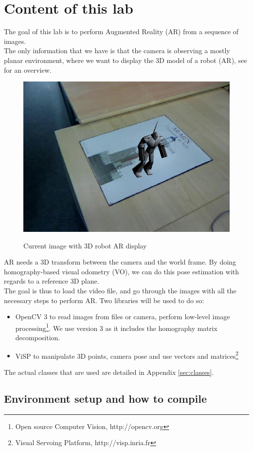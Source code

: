 \documentclass{ecnreport}
\begin{document}



\section{Content of this lab}

The goal of this lab is to perform Augmented Reality (AR) from a sequence of images.\\
The only information that we have is that the camera is observing a mostly planar environment, 
where we want to display the 3D model of a robot (AR), see  for an overview.

\begin{figure}[h!]
\centering\label{fig:ar}
 \includegraphics[width=.5\linewidth]{ar}
 \caption{Current image with 3D robot AR display}
\end{figure}

AR needs a 3D transform between the camera and the world frame. By doing homography-based visual odometry (VO), we can do this pose estimation 
with regards to a reference 3D plane. \\
The goal is thus to load the video file, and go through the images with all the necessary steps to perform AR. Two libraries will be used to do so: 
\begin{itemize}
 \item OpenCV 3 to read images from files or camera, perform low-level image processing\footnote{Open source Computer Vision, http://opencv.org}. We use version 3 as it includes
 the homography matrix decomposition. 
 \item ViSP to manipulate 3D points, camera pose and use vectors and matrices\footnote{Visual Servoing Platform, http://visp.inria.fr}
\end{itemize}
The actual classes that are used are detailed in Appendix \ref{sec:classes}.

\subsection{Environment setup and how to compile}
\end{document}

